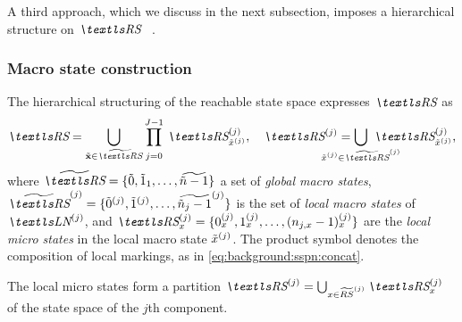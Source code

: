 A third approach, which we discuss in the next subsection, imposes a
hierarchical structure on $\RS$~%
\citep{DBLP:conf/cpe/BauseBK98,%
  DBLP:journals/sigmetrics/BuchholzK98,%
  DBLP:journals/tse/Buchholz99}.

\subsubsection{Macro state construction}

The hierarchical structuring of the reachable state space expresses
$\RS$ as
\begin{equation}
  \RS = \bigcup_{\macro{\vec{x}} \in \Macro{\RS}}
  \prod_{\vphantom{\Macro{\RS}}j = 0}^{J - 1}
  \, \loc{\RS}{j}_{\loc{\macro{x}}{j}}, \quad
  \loc{\RS}{j} = \bigcup_{\mathclap{\loc{\macro{x}}{j} \in \loc{\Macro{\RS}}{j}}}
  \,\, \loc{\RS}{j}_{\loc{\macro{x}}{j}} \text,
\end{equation}
where
$\Macro{\RS} = \{\macro{0}, \macro{1}_1, \ldots, \Macro{\macro{n} - 1}
\}$
a set of \emph{global macro states},
$\loc{\Macro{\RS}}{j} = \{\loc{\macro{0}}{j}, \loc{\macro{1}}{j},
\ldots, \loc{\Macro{\macro{n}_j - 1}}{j} \}$ is the set of \emph{local
macro states} of $\LN{j}$, and $\loc{\RS}{j}_{x} = \{\loc{0}{j}_x,
\loc{1}{j}_x, \ldots, \loc{(n_{j, x} - 1)}{j}_x \}$ are the
\emph{local micro states} in the local macro state
$\tilde{x}^{(j)}$. The product symbol denotes the composition of
local markings, as in \vref{eq:background:sspn:concat}.

The local micro states form a partition
$\loc{\RS}{j} = \bigcup_{x \in \loc{\Macro{RS}}{j}} \loc{\RS}{j}_{x}$
of the state space of the $j$th  component.

